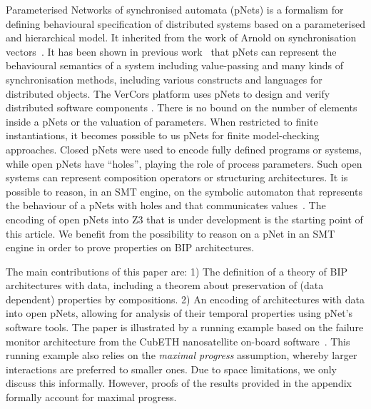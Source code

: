 \documentclass{llncs}
\newcommand{\Ludo}{\\\hfill\mdash Ludo}
\newcommand{\noteLH}[2][color=orange!40, size=\tiny]{\todo[#1]{{#2}\Ludo}}
\newcommand{\mdash}[1][]{---#1}
\begin{document}
Parameterised Networks of synchronised automata (pNets) is a formalism for defining behavioural specification of distributed systems based on a parameterised and hierarchical model.
It inherited from the work of
Arnold on synchronisation vectors~\cite{Arnold1982}. 
It has been shown in previous work~\cite{HMZ:PDP15} that pNets can  represent the behavioural semantics
of a system 
including value-passing and many kinds of synchronisation methods, including various constructs and
languages for distributed objects. The VerCors  platform uses pNets to design
and verify  distributed software components
\cite{CM:FMCO08,HKM-FASE16}. 
There is no bound on the number of elements inside a pNets or the valuation of parameters. When restricted to finite instantiations, it becomes possible to us pNets  for finite model-checking approaches.
Closed pNets were used to encode fully defined programs or systems,
while open pNets have ``holes'', playing the role of process
parameters. Such open systems can represent composition operators or structuring architectures.
It is possible to reason, in an SMT engine, on the symbolic automaton that represents the behaviour of a pNets with holes and that communicates values~\cite{HMZ-FORTE2016QBMZ-AVOCS18}. The encoding of open pNets into Z3 that is under development is the starting point of this article. We benefit from the possibility to reason on a pNet in an SMT engine in order to prove properties on BIP architectures.




The main contributions of this paper are: 1) The definition of a
theory of BIP architectures with data, including a theorem about
preservation of (data dependent) properties by 
compositions. 2) An encoding of architectures with data into  open pNets, allowing for analysis of their temporal properties using pNet's
software tools.  
The  paper is illustrated by a running
example based on the failure monitor architecture from the CubETH
nanosatellite on-board software~\cite{CubETH-case-study}.
%
This running example also relies on the \emph{maximal progress}
assumption, whereby larger interactions are preferred to smaller
ones.  Due to space limitations, we only discuss this
informally. However, proofs of the results provided in the
appendix formally account for maximal progress.
\end{document}
